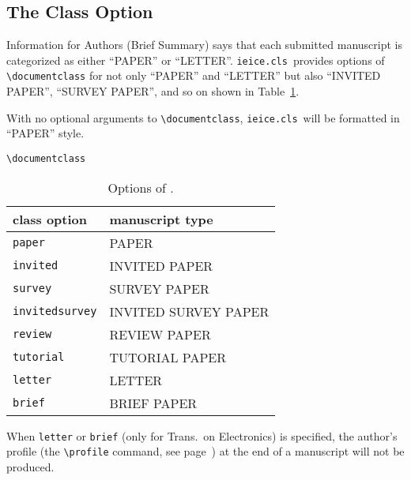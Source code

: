 \documentclass[paper]{ieice}
\def\ClassFile{\texttt{ieice.cls}}
\begin{document}
\subsection{The Class Option}

Information for Authors (Brief Summary) says that 
each submitted manuscript is categorized as either ``PAPER'' or ``LETTER''. 
\ClassFile\ provides options of \verb/\documentclass/ 
for not only ``PAPER'' and ``LETTER'' 
but also ``INVITED PAPER'', ``SURVEY PAPER'', 
and so on shown in Table~\ref{classoption}. 

With no optional arguments to \verb/\documentclass/, 
\ClassFile\ will be formatted in ``PAPER'' style. 


\begin{table}[tb]%
\hbox{\verb/\documentclass/}%
\caption{Options of .}
\label{classoption}
\begin{center}
\begin{tabular}{ll}
\hline
\textbf{class option}  & \textbf{manuscript type}\\
\hline
\texttt{paper}         & \textsf{PAPER}\\
\texttt{invited}       & \textsf{INVITED PAPER}\\
\texttt{survey}        & \textsf{SURVEY PAPER}\\
\texttt{invitedsurvey} & \textsf{INVITED SURVEY PAPER}\\
\texttt{review}        & \textsf{REVIEW PAPER}\\
\texttt{tutorial}      & \textsf{TUTORIAL PAPER}\\
\hline
\texttt{letter}        & \textsf{LETTER}\\
\texttt{brief}        & \textsf{BRIEF PAPER}\\
\hline
\end{tabular}%
\end{center}
\end{table}



When \texttt{letter} or \texttt{brief} (only for Trans.\ on Electronics) 
is specified, the author's profile 
(the \verb/\profile/ command, see page~\pageref{profile:command}) 
at the end of a manuscript will not be produced. 
\end{document}
